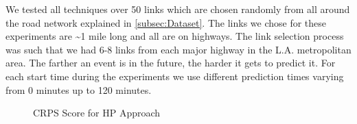 We tested all techniques over 50 links which are chosen randomly from all around the road network explained in \cref{subsec:Dataset}. The links we chose for these experiments are \textasciitilde 1 mile long and all are on highways. The link selection process was such that we had 6-8 links from each major highway in the L.A. metropolitan area. The farther an event is in the future, the harder it gets to predict it. For each start time during the experiments we use different prediction times varying from 0 minutes up to 120 minutes.

\begin{figure}[h]
	\centering
	\caption{CRPS Score for HP Approach}\label{fig:HP}
\end{figure}

